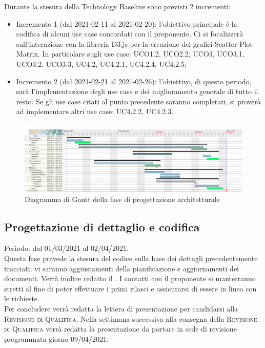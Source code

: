 \documentclass[../piano_di_progetto.tex]{subfiles}
\begin{document}
Durante la stesura della Technology Baseline sono previsti 2 incrementi:
\begin{itemize}
    \item Incremento 1 (dal 2021-02-11 al 2021-02-20): l'obiettivo principale è la codifica di alcuni use case concordati con il proponente. Ci si focalizzerà sull'interazione con la libreria D3.js per la creazione dei grafici Scatter Plot Matrix. In particolare sugli use case: UCO1.2, UCO2.2, UCO3, UCO3.1, UCO3.2, UCO3.3, UC4.2, UC4.2.1, UC4.2.4, UC4.2.5;
\item Incremento 2 (dal 2021-02-21 al 2021-02-26): l'obiettivo, di questo periodo, sarà l'implementazione degli use case e del miglioramento generale di tutto il resto. Se gli use case citati al punto precedente saranno completati, si proverà ad implementare altri use case: UC4.2.2, UC4.2.3.
\end{itemize}

\begin{figure}[H]
\centering
\includegraphics[width=18cm]{src/img/gantt/02_RP.png}
\caption{Diagramma di Gantt della fase di progettazione architetturale}
\end{figure}

\subsection{Progettazione di dettaglio e codifica}%
\label{sub:prog_dett}
Periodo: dal 01/03/2021 al 02/04/2021.\\
Questa fase prevede la stesura del codice sulla base dei dettagli precedentemente tracciati; vi saranno aggiustamenti della pianificazione e aggiornamenti dei documenti. Verrà inoltre redatto il \textsc{}. I contatti con il proponente si manterranno stretti al fine di poter effettuare i primi rilasci e assicurarsi di essere in linea con le richieste.\\
Per concludere verrà redatta la lettera di presentazione per candidarsi alla \textsc{Revisione di Qualifica}. Nella settimana successiva alla consegna della \textsc{Revisione di Qualifica} verrà redatta la presentazione da portare in sede di revisione programmata giorno 09/04/2021. 
\end{document}
